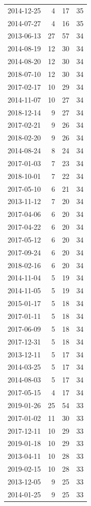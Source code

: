 \begin{tabular}{lrrr}
2014-12-25 & 4 & 17 & 35 \\
2014-07-27 & 4 & 16 & 35 \\
2013-06-13 & 27 & 57 & 34 \\
2014-08-19 & 12 & 30 & 34 \\
2014-08-20 & 12 & 30 & 34 \\
2018-07-10 & 12 & 30 & 34 \\
2017-02-17 & 10 & 29 & 34 \\
2014-11-07 & 10 & 27 & 34 \\
2018-12-14 & 9 & 27 & 34 \\
2017-02-21 & 9 & 26 & 34 \\
2018-02-20 & 9 & 26 & 34 \\
2014-08-24 & 8 & 24 & 34 \\
2017-01-03 & 7 & 23 & 34 \\
2018-10-01 & 7 & 22 & 34 \\
2017-05-10 & 6 & 21 & 34 \\
2013-11-12 & 7 & 20 & 34 \\
2017-04-06 & 6 & 20 & 34 \\
2017-04-22 & 6 & 20 & 34 \\
2017-05-12 & 6 & 20 & 34 \\
2017-09-24 & 6 & 20 & 34 \\
2018-02-16 & 6 & 20 & 34 \\
2014-11-04 & 5 & 19 & 34 \\
2014-11-05 & 5 & 19 & 34 \\
2015-01-17 & 5 & 18 & 34 \\
2017-01-11 & 5 & 18 & 34 \\
2017-06-09 & 5 & 18 & 34 \\
2017-12-31 & 5 & 18 & 34 \\
2013-12-11 & 5 & 17 & 34 \\
2014-03-25 & 5 & 17 & 34 \\
2014-08-03 & 5 & 17 & 34 \\
2017-05-15 & 4 & 17 & 34 \\
2019-01-26 & 25 & 54 & 33 \\
2017-01-02 & 11 & 30 & 33 \\
2017-12-11 & 10 & 29 & 33 \\
2019-01-18 & 10 & 29 & 33 \\
2013-04-11 & 10 & 28 & 33 \\
2019-02-15 & 10 & 28 & 33 \\
2013-12-05 & 9 & 25 & 33 \\
2014-01-25 & 9 & 25 & 33 \\

\end{tabular}
